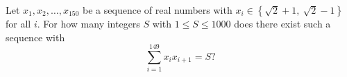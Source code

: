 Let $x_1,x_2,\dots,x_{150}$ be a sequence of real numbers with $x_i\in\left\{\sqrt2+1,\ \sqrt2-1\right\}$ for all $i$. For how many integers $S$ with $1\le S\le1000$ does there exist such a sequence with
\[\sum_{i=1}^{149}x_ix_{i+1}=S?\]
